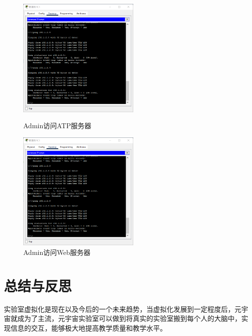 \documentclass{imutthesis}
\begin{document}
\begin{figure}[h]
    \centering
    \begin{minipage}[t]{0.48\textwidth}
        \centering
        \includegraphics[width=6cm]{ATP.png}
        \caption{Admin访问ATP服务器}
    \end{minipage}
    \begin{minipage}[t]{0.48\textwidth}
        \centering
        \includegraphics[width=6cm]{wEB.png}
        \caption{Admin访问Web服务器}
    \end{minipage}
\end{figure}
\section{总结与反思}
实验室虚拟化是现在以及今后的一个未来趋势，当虚拟化发展到一定程度后，元宇宙就成为了主流，元宇宙实验室可以做到将真实的实验室搬到每个人的大脑中，实现信息的交互，能够极大地提高教学质量和教学水平。
\end{document}
